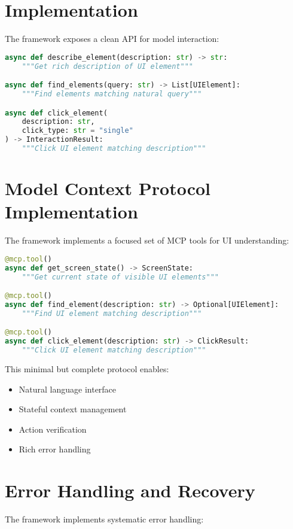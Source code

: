 \documentclass{article}
\begin{document}
\section{Implementation}
The framework exposes a clean API for model interaction:

\begin{lstlisting}[language=Python]
async def describe_element(description: str) -> str:
    """Get rich description of UI element"""

async def find_elements(query: str) -> List[UIElement]:
    """Find elements matching natural query"""

async def click_element(
    description: str,
    click_type: str = "single"
) -> InteractionResult:
    """Click UI element matching description"""
\end{lstlisting}

\section{Model Context Protocol Implementation}
The framework implements a focused set of MCP tools for UI understanding:

\begin{lstlisting}[language=Python]
@mcp.tool()
async def get_screen_state() -> ScreenState:
    """Get current state of visible UI elements"""

@mcp.tool()
async def find_element(description: str) -> Optional[UIElement]:
    """Find UI element matching description"""

@mcp.tool()
async def click_element(description: str) -> ClickResult:
    """Click UI element matching description"""
\end{lstlisting}

This minimal but complete protocol enables:
\begin{itemize}
    \item Natural language interface
    \item Stateful context management
    \item Action verification
    \item Rich error handling
\end{itemize}

\section{Error Handling and Recovery}
The framework implements systematic error handling:
\end{document}
